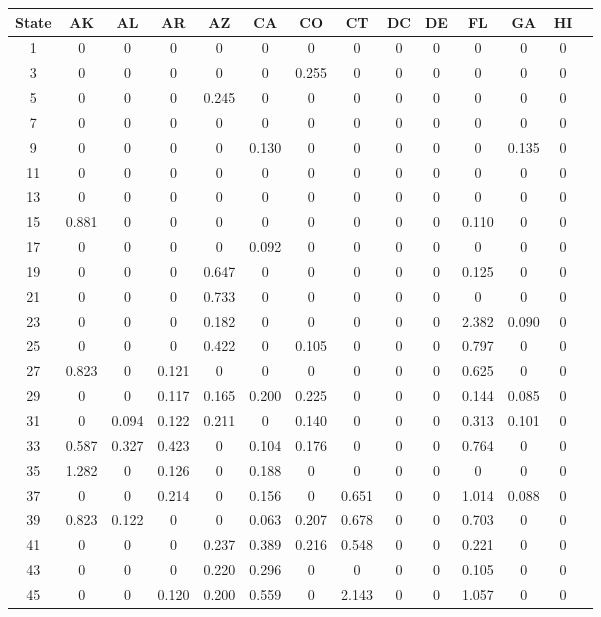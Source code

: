 
\begin{table*}[htb]
\footnotesize
    \centering
    \begin{tabular}{|c |c |c |c |c |c |c |c |c |c |c |c |c |c|}\hline
        \textbf{State} & \textbf{AK}& \textbf{AL}& \textbf{AR}& \textbf{AZ}& \textbf{CA}& \textbf{CO}& \textbf{CT}& \textbf{DC}& \textbf{DE}& \textbf{FL}& \textbf{GA}& \textbf{HI} \\\hline
    1&0& 0& 0& 0& 0& 0& 0& 0& 0& 0& 0& 0\\\hline
3&0& 0& 0& 0& 0& 0.255& 0& 0& 0& 0& 0& 0\\\hline
5&0& 0& 0& 0.245& 0& 0& 0& 0& 0& 0& 0& 0\\\hline
7&0& 0& 0& 0& 0& 0& 0& 0& 0& 0& 0& 0\\\hline
9&0& 0& 0& 0& 0.130& 0& 0& 0& 0& 0& 0.135& 0\\\hline
11&0& 0& 0& 0& 0& 0& 0& 0& 0& 0& 0& 0\\\hline
13&0& 0& 0& 0& 0& 0& 0& 0& 0& 0& 0& 0\\\hline
15&0.881& 0& 0& 0& 0& 0& 0& 0& 0& 0.110& 0& 0\\\hline
17&0& 0& 0& 0& 0.092& 0& 0& 0& 0& 0& 0& 0\\\hline
19&0& 0& 0& 0.647& 0& 0& 0& 0& 0& 0.125& 0& 0\\\hline
21&0& 0& 0& 0.733& 0& 0& 0& 0& 0& 0& 0& 0\\\hline
23&0& 0& 0& 0.182& 0& 0& 0& 0& 0& 2.382& 0.090& 0\\\hline
25&0& 0& 0& 0.422& 0& 0.105& 0& 0& 0& 0.797& 0& 0\\\hline
27&0.823& 0& 0.121& 0& 0& 0& 0& 0& 0& 0.625& 0& 0\\\hline
29&0& 0& 0.117& 0.165& 0.200& 0.225& 0& 0& 0& 0.144& 0.085& 0\\\hline
31&0& 0.094& 0.122& 0.211& 0& 0.140& 0& 0& 0& 0.313& 0.101& 0\\\hline
33&0.587& 0.327& 0.423& 0& 0.104& 0.176& 0& 0& 0& 0.764& 0& 0\\\hline
35&1.282& 0& 0.126& 0& 0.188& 0& 0& 0& 0& 0& 0& 0\\\hline
37&0& 0& 0.214& 0& 0.156& 0& 0.651& 0& 0& 1.014& 0.088& 0\\\hline
39&0.823& 0.122& 0& 0& 0.063& 0.207& 0.678& 0& 0& 0.703& 0& 0\\\hline
41&0& 0& 0& 0.237& 0.389& 0.216& 0.548& 0& 0& 0.221& 0& 0\\\hline
43&0& 0& 0& 0.220& 0.296& 0& 0& 0& 0& 0.105& 0& 0\\\hline
45&0& 0& 0.120& 0.200& 0.559& 0& 2.143& 0& 0& 1.057& 0& 0\\\hline

\end{tabular}
\end{table*}
